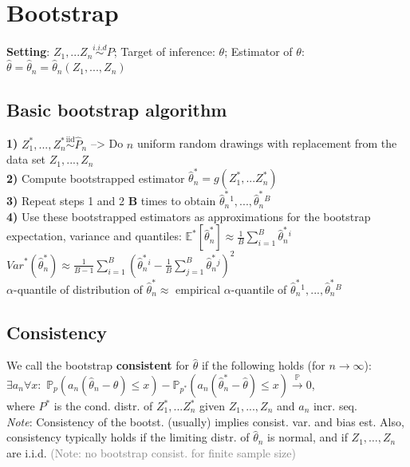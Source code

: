 \section{Bootstrap}
\textbf{Setting}: $Z_1, ... Z_n \overset{i.i.d}{\sim} P$; Target of inference: $\theta$; Estimator of $\theta$: $\hat{\theta} = \hat{\theta}_n = \hat{\theta}_n(Z_1,...,Z_n)$

\subsection*{Basic bootstrap algorithm}
\textbf{1)} $Z_1^*,...,Z_n^* \overset{\mathrm{iid}}{\sim} \hat{P}_n$ --> Do $n$ uniform random drawings with replacement from the data set ${Z_1,...,Z_n}$ \\
\textbf{2)} Compute bootstrapped estimator $\hat{\theta}_n^* = g(Z_1^*,...Z_n^*)$ \\
\textbf{3)} Repeat steps 1 and 2 \textbf{B} times to obtain $\hat{\theta}_n^*{^1}, ..., \hat{\theta}_n^*{^B}$ \\
\textbf{4)} Use these bootstrapped estimators as approximations for the bootstrap expectation, variance and quantiles:
        $\mathbb{E}^*[\hat{\theta}_n^*] \approx \frac{1}{B} \sum_{i=1}^{B} \hat{\theta}_n^*{^i}$ \\ 
        ${Var}^*(\hat{\theta}_n^*) \approx \frac{1}{B-1} \sum_{i=1}^{B}(\hat{\theta}_n^*{^i} - \frac{1}{B}\sum_{j=1}^{B}\hat{\theta}_n^*{^j})^2$ \\
        $\alpha$-quantile of distribution of $\hat{\theta}_n^* \approx$ empirical $\alpha$-quantile of $\hat{\theta}_n^*{^1}, ..., \hat{\theta}_n^*{^B}$

\subsection*{Consistency}
We call the bootstrap \textbf{consistent} for $\hat{\theta}$ if the following holds (for $n\to\infty$):  $\exists{a_n} \forall{x}:$  
$\mathbb{P}_p(a_n(\hat{\theta}_n - \theta) \le x) - \mathbb{P}_{p^{*}}(a_n(\hat{\theta}_n^{*} - \hat{\theta}) \le x) \overset{\mathbb{P}}{\to} 0$, \\
where $P^*$ is the cond. distr. of ${Z_1^*,...Z_n^*}$ given ${Z_1,...,Z_n}$ and $a_n$ incr. seq.\\
\emph{Note}: Consistency of the bootst. (usually) implies consist. var. and bias est. Also, consistency typically holds if the limiting distr. of $\hat{\theta}_n$ is normal, and if $Z_1, \ldots, Z_n$ are i.i.d. \textcolor{gray}{(Note: no bootstrap consist. for finite sample size)}

